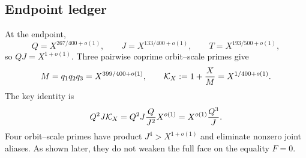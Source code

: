 \subsection{Endpoint ledger}

At the endpoint,
\begin{equation}
 Q=X^{267/400+o(1)},\qquad
 J=X^{133/400+o(1)},\qquad
 T=X^{193/500+o(1)},
 \label{eq:tpc38-interface-endpoint}
\end{equation}
so \(QJ=X^{1+o(1)}\).  Three pairwise coprime orbit--scale primes give
\begin{equation}
 M=q_1q_2q_3=X^{399/400+o(1)},
 \qquad
 \mathcal K_X:=1+\frac XM=X^{1/400+o(1)}.
 \label{eq:tpc38-interface-M-K}
\end{equation}
The key identity is
\begin{equation}
 Q^2J\mathcal K_X
 =Q^2J\frac Q{J^2}X^{o(1)}
 =X^{o(1)}\frac{Q^3}{J}.
 \label{eq:tpc38-interface-key-ledger}
\end{equation}
Four orbit--scale primes have product \(J^4>X^{1+o(1)}\) and eliminate
nonzero joint aliases.  As shown later, they do not weaken the full face
on the equality \(F=0\).
